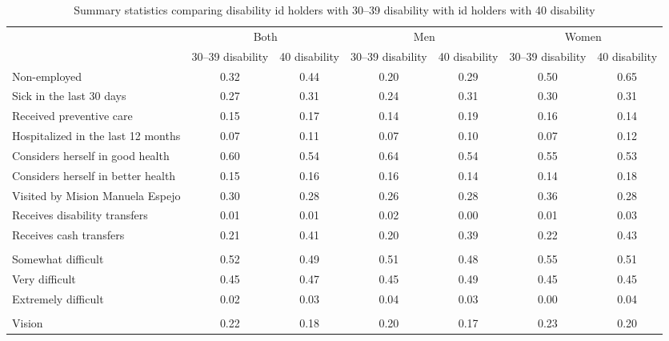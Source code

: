 \documentclass[
]{article}
\begin{document}
\begin{table}

\caption{\label{tab:unnamed-chunk-17}Summary statistics comparing disability id holders with 30–39 disability with id holders with 40 disability}
\centering
\fontsize{10}{12}\selectfont
\begin{tabular}[t]{lcccccc}
\toprule
\multicolumn{1}{c}{ } & \multicolumn{2}{c}{Both} & \multicolumn{2}{c}{Men} & \multicolumn{2}{c}{Women} \\
\cmidrule(l{3pt}r{3pt}){2-3} \cmidrule(l{3pt}r{3pt}){4-5} \cmidrule(l{3pt}r{3pt}){6-7}
  & 30–39 disability & 40 disability & 30–39 disability & 40 disability & 30–39 disability & 40 disability\\
\midrule
Non-employed & 0.32 & 0.44 & 0.20 & 0.29 & 0.50 & 0.65\\
Sick in the last 30 days & 0.27 & 0.31 & 0.24 & 0.31 & 0.30 & 0.31\\
Received preventive care & 0.15 & 0.17 & 0.14 & 0.19 & 0.16 & 0.14\\
Hospitalized in the last 12 months & 0.07 & 0.11 & 0.07 & 0.10 & 0.07 & 0.12\\
Considers herself in good health & 0.60 & 0.54 & 0.64 & 0.54 & 0.55 & 0.53\\
Considers herself in better health & 0.15 & 0.16 & 0.16 & 0.14 & 0.14 & 0.18\\
Visited by Mision Manuela Espejo & 0.30 & 0.28 & 0.26 & 0.28 & 0.36 & 0.28\\
Receives disability transfers & 0.01 & 0.01 & 0.02 & 0.00 & 0.01 & 0.03\\
Receives cash transfers & 0.21 & 0.41 & 0.20 & 0.39 & 0.22 & 0.43\\
\addlinespace[0.4em]
\multicolumn{7}{l}{\textit{Self-assessment of the impairment}}\\
\hspace{1em}Somewhat difficult & 0.52 & 0.49 & 0.51 & 0.48 & 0.55 & 0.51\\
\hspace{1em}Very difficult & 0.45 & 0.47 & 0.45 & 0.49 & 0.45 & 0.45\\
\hspace{1em}Extremely difficult & 0.02 & 0.03 & 0.04 & 0.03 & 0.00 & 0.04\\
\addlinespace[0.4em]
\multicolumn{7}{l}{\textit{Type of disability}}\\
\hspace{1em}Vision & 0.22 & 0.18 & 0.20 & 0.17 & 0.23 & 0.20\\

\end{tabular}
\end{table}
\end{document}

